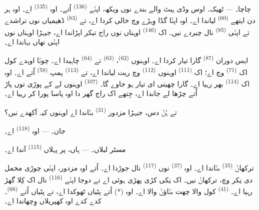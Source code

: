 \textsc{چاچا}۔ --- ٹھیک۔ اوس وڈی ہیٹ والے بندے نوں ویکھ، اپݨے 
\textsuperscript{(136)} اُتے۔ اوہ  \textsuperscript{(135)} اے۔ اوہ
ہر دن ایتھے  \textsuperscript{(60)} لیاندا اے۔ اوہ اپݨا گڈا
وِہڑے وچ خالی کردا اے، تے  \textsuperscript{(83)} ڈھیمیاں نوں
تراشدے تے اپݨی  \textsuperscript{(85)} نال چیردے نیں۔ اک
 \textsuperscript{(146)} اوہناں نوں راج تیکر اپڑاندا اے، جیہڑا اوہناں
نوں اپݨی تھاں بہاندا اے۔

ایس دوران  \textsuperscript{(87)} گارا تیار کردا اے۔
اوہنوں  \textsuperscript{(62)}،  \textsuperscript{(63)} تے
 \textsuperscript{(64)} چاہیدا اے۔ چوݨا اوہدے کول اک 
\textsuperscript{(71)} وچ اے؛ اک  \textsuperscript{(111)}
اوہنوں  \textsuperscript{(112)} وچ ریت لیاندا اے، تے
 \textsuperscript{(113)} پمپ \textsuperscript{(58)} اُتے اے۔ اوہ اک
 \textsuperscript{(114)} بھر رہیا اے۔ گارا چھیتی ای تیار ہو جاوے گا۔
 \textsuperscript{(107)} اوہنوں لے کے پوڑی توں پاڑ اُتے چڑھا
لے جاندا اے، جِتھے اک راج گھر دا اوہ پاسا پورا کر رہیا اے۔

تے ہُݨ دس، جیہڑا مزدور  \textsuperscript{(31)} بݨاندا اے اوہنوں کیہ
آکھدے نیں؟

\textsc{جان}۔ --- اوہ  \textsuperscript{(118)} اے۔

\VUsaut{3.0mm}
\VUsaut{3.0mm}

\textsc{مسٹر لبلاں}۔ --- ہاں، پر پہلاں  \textsuperscript{(115)}
آندا اے۔

ترکھاݨ  \textsuperscript{(35)} بݨاندا اے۔ اوہ
 \textsuperscript{(37)} نوں  \textsuperscript{(117)}
نال جوڑدا اے۔ اُتے اوہ مزدور، اپݨی چوڑی مخمل دی نِکر وچ، ترکھاݨ نیں۔ اک نِکی کڑی
پھڑی ہوئی اے تے دوجا اپݨے  \textsuperscript{(116)} نال اک کِلا گھڑ
رہیا اے۔  \textsuperscript{(41)} کول والا چھت بݨاؤݨ والا اے۔ اوہ
 (*) اُتے پٹیاں ٹھوکدا اے، تے پٹیاں اُتے 
\textsuperscript{(66)}۔ کدے کدے اوہ کھپریلاں وِچھاندا اے۔


